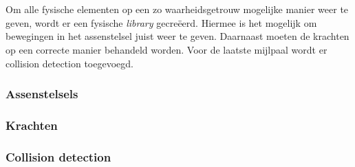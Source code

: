\\
\\
Om alle fysische elementen op een zo waarheidsgetrouw mogelijke manier weer te geven, wordt er een fysische \textit{library} gecre\"eerd. Hiermee is het mogelijk om bewegingen in het assenstelsel juist weer te geven. Daarnaast moeten de krachten op een correcte manier behandeld worden. Voor de laatste mijlpaal wordt er collision detection toegevoegd. 
\subsubsection{Assenstelsels}
\label{subsec: Assenstelsels}


\subsubsection{Krachten}
\label{subsec: Krachten}


\subsubsection{Collision detection}
\label{subsec: Collision detection}

